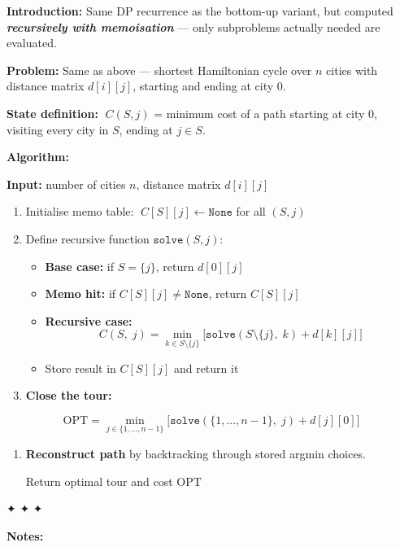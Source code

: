 \documentclass[11pt]{article}
\providecommand{\tightlist}{%
      \setlength{\itemsep}{0pt}\setlength{\parskip}{0pt}}
\begin{document}
    \textbf{Introduction:} Same DP recurrence as the bottom-up variant, but
computed \textbf{\emph{recursively with memoisation}} --- only
subproblems actually needed are evaluated.

\textbf{Problem:} Same as above --- shortest Hamiltonian cycle over
\(n\) cities with distance matrix \(d[i][j]\), starting and ending at
city \(0\).

\textbf{State definition:} \(\;C(S, j)\) = minimum cost of a path
starting at city \(0\), visiting every city in \(S\), ending at
\(j \in S\).

    \textbf{Algorithm:}

\textbf{Input:} number of cities \(n\), distance matrix \(d[i][j]\)

\begin{enumerate}
\def\labelenumi{\arabic{enumi}.}
\item
  Initialise memo table: \(\;C[S][j] \leftarrow \texttt{None}\) for all
  \((S, j)\)
\item
  Define recursive function \(\texttt{solve}(S, j)\):

  \begin{itemize}
  \tightlist
  \item
    \textbf{Base case:} if \(S = \{j\}\), return \(d[0][j]\)
  \item
    \textbf{Memo hit:} if \(C[S][j] \neq \texttt{None}\), return
    \(C[S][j]\)
  \item
    \textbf{Recursive case:}
    \[C(S,\; j) = \min_{k \in S \setminus \{j\}} \bigl[\texttt{solve}(S \setminus \{j\},\; k) + d[k][j]\bigr]\]
  \item
    Store result in \(C[S][j]\) and return it
  \end{itemize}
\item
  \textbf{Close the tour:}
\end{enumerate}

\[\text{OPT} = \min_{j \in \{1,\ldots,n-1\}} \bigl[\texttt{solve}(\{1,\ldots,n{-}1\},\; j) + d[j][0]\bigr]\]

\begin{enumerate}
\def\labelenumi{\arabic{enumi}.}
\setcounter{enumi}{3}
\item
  \textbf{Reconstruct path} by backtracking through stored argmin
  choices.

  Return optimal tour and cost \(\text{OPT}\)
\end{enumerate}

✦ ✦ ✦

\textbf{Notes:}
\end{document}
